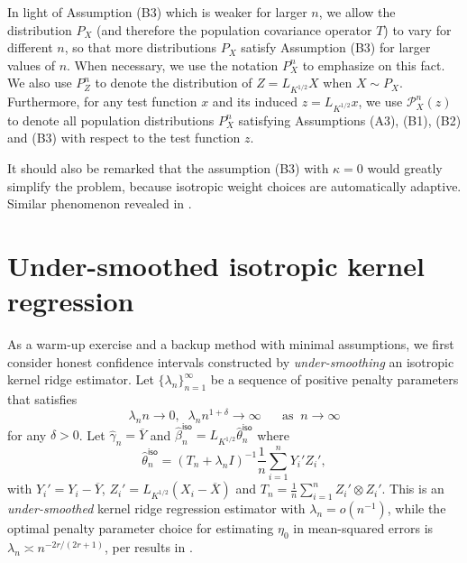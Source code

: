 \documentclass[aos]{imsart}
\renewcommand{\hat}{\widehat}
\renewcommand{\bar}{\overline}
\newcommand{\iso}{\mathsf{iso}}
\theoremstyle{plain}
\theoremstyle{definition}
\theoremstyle{definition}
\begin{document}
%
%

{\color{red}In light of Assumption (B3) which is weaker for larger $n$, we allow the distribution $P_X$ (and therefore the population covariance operator $T$) to vary for different $n$,
so that more distributions $P_X$ satisfy Assumption (B3) for larger values of $n$.
When necessary, we use the notation $P_X^n$ to emphasize on this fact.
We also use $P_Z^n$ to denote the distribution of $Z=L_{K^{1/2}}X$ when $X\sim P_X$.
Furthermore, for any test function $x$ and its induced $z=L_{K^{1/2}}x$, we use $\mathcal P_X^n(z)$ to denote all population distributions $P_X^n$ satisfying Assumptions (A3), (B1), (B2) and (B3) with respect to the test function $z$.}

{\color{red}It should also be remarked that the assumption (B3) with $\kappa=0$ would greatly simplify the problem, because isotropic weight choices are automatically adaptive.
Similar phenomenon revealed in \citep{liu2025scalable}.}

\section{Under-smoothed isotropic kernel regression}\label{sec:isotropic}

As a warm-up exercise and a backup method with minimal assumptions, we first consider honest confidence intervals constructed by \emph{under-smoothing} an isotropic kernel ridge estimator.
Let $\{\lambda_n\}_{n=1}^{\infty}$ be a sequence of positive penalty parameters that satisfies
\begin{equation}
\lambda_n n \to 0,\;\; \lambda_n n^{1+\delta}\to \infty\;\;\;\;\;\;\text{as}\;\;n\to\infty
\label{eq:lambdan-1}
\end{equation}
for any $\delta>0$.
Let $\hat\gamma_n = \bar Y$ and $\hat\beta_n^\iso=L_{K^{1/2}}\hat\theta_n^\iso$ where 
$$
\hat\theta_n^\iso = (T_n+\lambda_n I)^{-1}\frac{1}{n}\sum_{i=1}^n Y_i'Z_i',
$$
with $Y_i'=Y_i-\bar Y$, $Z_i'=L_{K^{1/2}}(X_i-\bar X)$ and $T_n=\frac{1}{n}\sum_{i=1}^n Z_i'\otimes Z_i'$.
This is an \emph{under-smoothed} kernel ridge regression estimator with $\lambda_n=o(n^{-1})$, while the optimal penalty parameter choice for estimating $\eta_0$ in mean-squared errors 
is $\lambda_n\asymp n^{-2r/(2r+1)}$, per results in \cite{cai2012minimax}.
\end{document}
